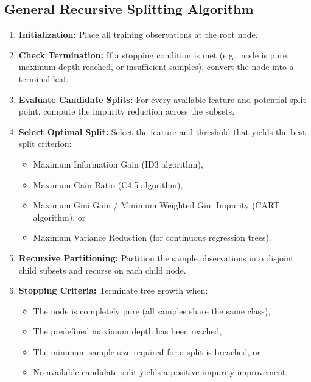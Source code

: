 \subsection{General Recursive Splitting Algorithm}
\begin{enumerate}
    \item \textbf{Initialization:} Place all training observations at the root node.
    \item \textbf{Check Termination:} If a stopping condition is met (e.g., node is pure, maximum depth reached, or insufficient samples), convert the node into a terminal leaf.
    \item \textbf{Evaluate Candidate Splits:} For every available feature and potential split point, compute the impurity reduction across the subsets.
    \item \textbf{Select Optimal Split:} Select the feature and threshold that yields the best split criterion:
    \begin{itemize}
        \item Maximum Information Gain (ID3 algorithm),
        \item Maximum Gain Ratio (C4.5 algorithm),
        \item Maximum Gini Gain / Minimum Weighted Gini Impurity (CART algorithm), or
        \item Maximum Variance Reduction (for continuous regression trees).
    \end{itemize}
    \item \textbf{Recursive Partitioning:} Partition the sample observations into disjoint child subsets and recurse on each child node.
    \item \textbf{Stopping Criteria:} Terminate tree growth when:
    \begin{itemize}
        \item The node is completely pure (all samples share the same class),
        \item The predefined maximum depth has been reached,
        \item The minimum sample size required for a split is breached, or
        \item No available candidate split yields a positive impurity improvement.
    \end{itemize}
\end{enumerate}

